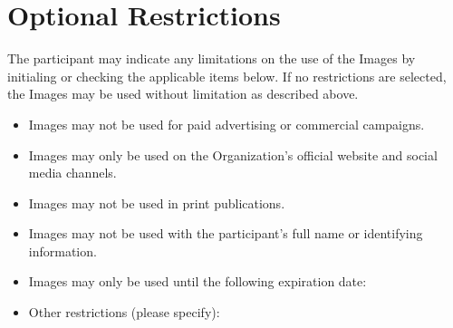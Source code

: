 
\section{Optional Restrictions}
\label{sec:restrictions}

The participant may indicate any limitations on the use of the Images by initialing or checking the applicable items below. If no restrictions are selected, the Images may be used without limitation as described above.

\begin{itemize}
  \item[$\square$] Images may not be used for paid advertising or commercial campaigns.
  \item[$\square$] Images may only be used on the Organization’s official website and social media channels.
  \item[$\square$] Images may not be used in print publications.
  \item[$\square$] Images may not be used with the participant’s full name or identifying information.
  \item[$\square$] Images may only be used until the following expiration date: 
  \item[$\square$] Other restrictions (please specify):
\end{itemize}


